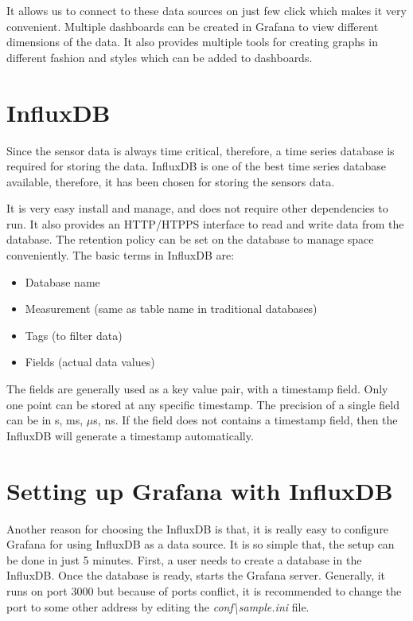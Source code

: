 It allows us to connect to these data sources on just few click which makes it very convenient. Multiple dashboards can be created in Grafana to view different dimensions of the data. It also provides multiple tools for creating graphs in different fashion and styles which can be added to dashboards.

\section{InfluxDB}
 Since the sensor data is always time critical, therefore, a time series database is required for storing the data. InfluxDB is one of the best time series database available, therefore, it has been chosen for storing the sensors data. 
 
 It is very easy install and manage, and does not require other dependencies to run. It also provides an HTTP/HTPPS interface to read and write data from the database. The retention policy can be set on the database to manage space conveniently. The basic terms in InfluxDB are:
 
 \begin{itemize}
 	\item Database name
 	\item Measurement (same as table name in traditional databases)
 	\item Tags (to filter data)
 	\item Fields (actual data values)
 \end{itemize}
 
 The fields are generally used as a key value pair, with a timestamp field. Only one point can be stored at any specific timestamp. The precision of a single field can be in s, ms, $\mu$s, ns. If the field does not contains a timestamp field, then the InfluxDB will generate a timestamp automatically.
 
 
 \section{Setting up Grafana with InfluxDB}
 Another reason for choosing the InfluxDB is that, it is really easy to configure Grafana for using InfluxDB as a data source. It is so simple that, the setup can be done in just 5 minutes. First, a user needs to create a database in the InfluxDB. Once the database is ready, starts the Grafana server. Generally, it runs on port 3000 but because of ports conflict, it is recommended to change the port to some other address by editing the \textit{conf\textbackslash sample.ini} file.
 
